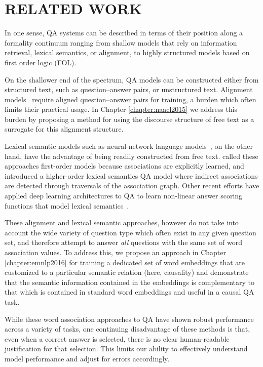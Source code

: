 \chapter{RELATED WORK\label{chapter:related_work}}

In one sense, QA systems can be described in terms of their position along a formality continuum ranging from shallow models that rely on information retrieval, lexical semantics, or alignment, to highly structured models based on first order logic (FOL).

On the shallower end of the spectrum,  QA models can be constructed either from structured text, such as question--answer pairs, or unstructured text.  Alignment models~\citep{Berger:00,echihabi2003noisy,Soricut:06,Riezler:etal:2007,Surdeanu:11,yao2013}  require aligned question--answer pairs for training, a burden which often limits their practical usage.  In Chapter \ref{chapter:naacl2015} we address this burden by proposing a method for using the discourse structure of free text as a surrogate for this alignment structure. %

Lexical semantic models such as neural-network language models~\citep{jansen14,sultan-etal:2014:TACL,yih13}, on the other hand, have the advantage of being readily constructed from free text.  
\citet{fried2015higher} called these approaches first-order models because associations are explicitly learned, and introduced a higher-order lexical semantics QA model where indirect associations are detected through traversals of the association graph.  
Other recent efforts have applied deep learning architectures to QA to learn non-linear answer scoring functions that model lexical semantics~\citep{Iyyer2014,nips15_hermann}.

These alignment and lexical semantic approaches, however do not take into account the wide variety of question type which often exist in any given question set, and therefore attempt to answer \emph{all} questions with the same set of word association values.  To address this, we propose an approach in Chapter \ref{chapter:emnlp2016} for training a dedicated set of word embeddings that are customized to a particular semantic relation (here, causality) and demonstrate that the semantic information contained in the embeddings is complementary to that which is contained in standard word embeddings and useful in a causal QA task.

While these word association approaches to QA have shown robust performance across a variety of tasks, one continuing disadvantage of these methods is that, even when a correct answer is selected, there is no clear human-readable justification for that selection.  This limits our ability to effectively understand model performance and adjust for errors accordingly.

